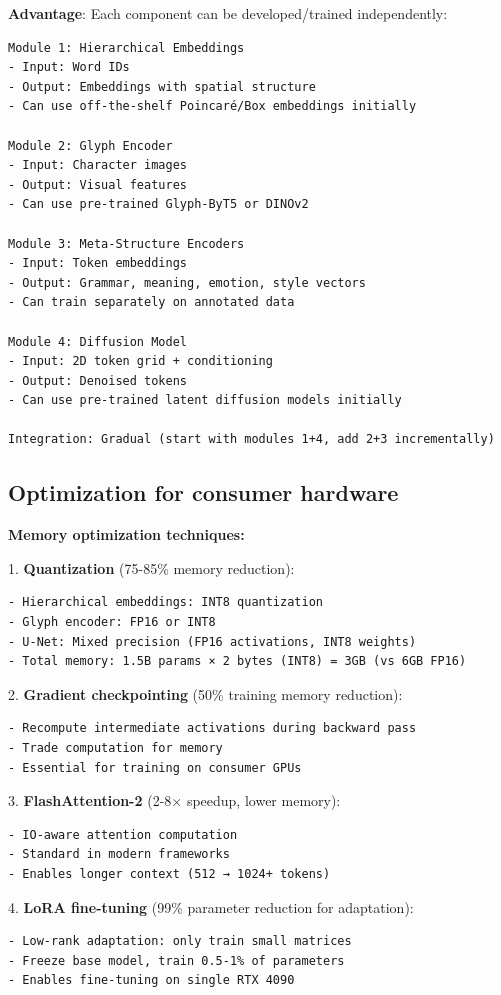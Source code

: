 \documentclass[11pt]{article}
\begin{document}
\textbf{Advantage}: Each component can be developed/trained independently:

\begin{verbatim}
Module 1: Hierarchical Embeddings
- Input: Word IDs
- Output: Embeddings with spatial structure
- Can use off-the-shelf Poincaré/Box embeddings initially

Module 2: Glyph Encoder
- Input: Character images
- Output: Visual features
- Can use pre-trained Glyph-ByT5 or DINOv2

Module 3: Meta-Structure Encoders
- Input: Token embeddings
- Output: Grammar, meaning, emotion, style vectors
- Can train separately on annotated data

Module 4: Diffusion Model
- Input: 2D token grid + conditioning
- Output: Denoised tokens
- Can use pre-trained latent diffusion models initially

Integration: Gradual (start with modules 1+4, add 2+3 incrementally)
\end{verbatim}

\subsection{Optimization for consumer hardware}

\textbf{Memory optimization techniques:}

1. \textbf{Quantization} (75-85\% memory reduction):
\begin{verbatim}
- Hierarchical embeddings: INT8 quantization
- Glyph encoder: FP16 or INT8
- U-Net: Mixed precision (FP16 activations, INT8 weights)
- Total memory: 1.5B params × 2 bytes (INT8) = 3GB (vs 6GB FP16)
\end{verbatim}

2. \textbf{Gradient checkpointing} (50\% training memory reduction):
\begin{verbatim}
- Recompute intermediate activations during backward pass
- Trade computation for memory
- Essential for training on consumer GPUs
\end{verbatim}

3. \textbf{FlashAttention-2} (2-8\(\times\) speedup, lower memory):
\begin{verbatim}
- IO-aware attention computation
- Standard in modern frameworks
- Enables longer context (512 → 1024+ tokens)
\end{verbatim}

4. \textbf{LoRA fine-tuning} (99\% parameter reduction for adaptation):
\begin{verbatim}
- Low-rank adaptation: only train small matrices
- Freeze base model, train 0.5-1% of parameters
- Enables fine-tuning on single RTX 4090
\end{verbatim}
\end{document}
